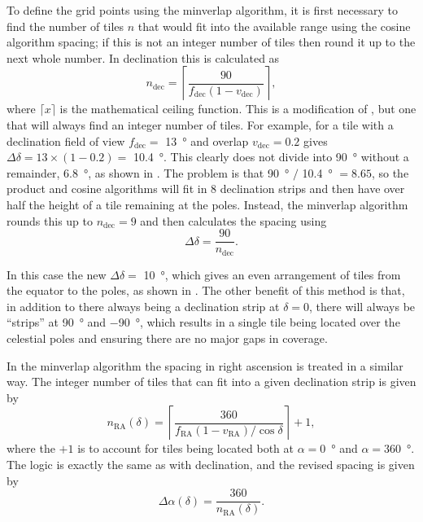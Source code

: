 \begin{colsection}
\clearpage

To define the grid points using the minverlap algorithm, it is first necessary to find the number of tiles $n$ that would fit into the available range using the cosine algorithm spacing; if this is not an integer number of tiles then round it up to the next whole number. In declination this is calculated as
%
\begin{equation}
    n_\text{dec} = \left \lceil \frac{90}{f_\text{dec}(1-v_\text{dec})} \right \rceil,
    \label{eq:minverlap_ndec}
\end{equation}
%
where $\lceil x \rceil$ is the mathematical ceiling function. This is a modification of , but one that will always find an integer number of tiles. For example, for a tile with a declination field of view $f_\text{dec} = $ \SI{13}{\degree} and overlap $v_\text{dec} = 0.2$  gives $\Delta\delta = 13 \times (1-0.2) = $ \SI{10.4}{\degree}. This clearly does not divide into \SI{90}{\degree} without a remainder, \SI{6.8}{\degree}, as shown in . The problem is that \SI{90}{\degree} $/$ \SI{10.4}{\degree} $= 8.65$, so the product and cosine algorithms will fit in 8 declination strips and then have over half the height of a tile remaining at the poles. Instead, the minverlap algorithm rounds this up to $n_\text{dec} = 9$ and then calculates the spacing using
%
\begin{equation}
    \Delta\delta = \frac{90}{n_\text{dec}}.
    \label{eq:minverlap_deltadelta}
\end{equation}

In this case the new $\Delta\delta = $ \SI{10}{\degree}, which gives an even arrangement of tiles from the equator to the poles, as shown in . The other benefit of this method is that, in addition to there always being a declination strip at $\delta=0$, there will always be ``strips'' at \SI{+90}{\degree} and \SI{-90}{\degree}, which results in a single tile being located over the celestial poles and ensuring there are no major gaps in coverage.

In the minverlap algorithm the spacing in right ascension is treated in a similar way. The integer number of tiles that can fit into a given declination strip is given by
%
\begin{equation}
    n_\text{RA}(\delta) = \left \lceil \frac{360}{f_\text{RA}(1-v_\text{RA})/\cos \delta} \right \rceil + 1,
    \label{eq:minverlap_nra}
\end{equation}
%
where the $+1$ is  to account for tiles being located both at $\alpha=$\SI{0}{\degree} and $\alpha=$\SI{360}{\degree}. The logic is exactly the same as with declination, and the revised spacing is given by
%
\begin{equation}
    \Delta\alpha(\delta) = \frac{360}{n_\text{RA}(\delta)}.
    \label{eq:minverlap_deltaalpha}
\end{equation}


\end{colsection}
